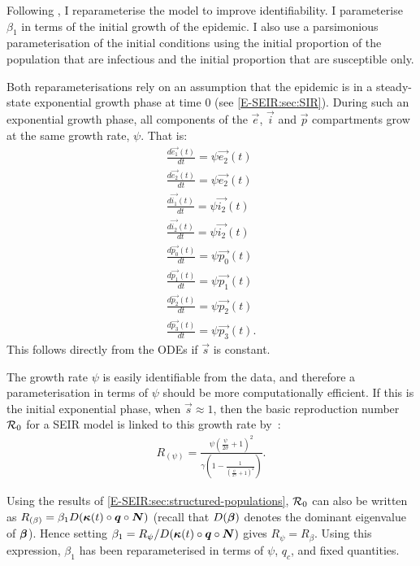 \documentclass[thesis.tex]{subfiles}
\begin{document}
Following \textcite{birrellBayesian}, I reparameterise the model to improve identifiability.
I parameterise $\beta_1$ in terms of the initial growth of the epidemic.
I also use a parsimonious parameterisation of the initial conditions using the initial proportion of the population that are infectious and the initial proportion that are susceptible only.

Both reparameterisations rely on an assumption that the epidemic is in a steady-state exponential growth phase at time 0 (see \cref{E-SEIR:sec:SIR}). During such an exponential growth phase, all components of the $\vec{e}$, $\vec{i}$ and $\vec{p}$ compartments grow at the same growth rate, $\psi$.
That is:
\begin{equation}
\begin{aligned}
\frac{d\vec{e_1}(t)}{dt} = \psi \vec{e_2}(t) \\
\frac{d\vec{e_2}(t)}{dt} = \psi \vec{e_2}(t) \\
\frac{d\vec{i_1}(t)}{dt} = \psi \vec{i_2}(t) \\
\frac{d\vec{i_2}(t)}{dt} = \psi \vec{i_2}(t) \\
\frac{d\vec{p_0}(t)}{dt} = \psi \vec{p_0}(t) \\
\frac{d\vec{p_1}(t)}{dt} = \psi \vec{p_1}(t) \\
\frac{d\vec{p_2}(t)}{dt} = \psi \vec{p_2}(t) \\
\frac{d\vec{p_3}(t)}{dt} = \psi \vec{p_3}(t).
\end{aligned}
\label{SEIR:eq:exponential-growth}
\end{equation}
This follows directly from the ODEs if $\vec{s}$ is constant. 

The growth rate $\psi$ is easily identifiable from the data, and therefore a parameterisation in terms of $\psi$ should be more computationally efficient.
If this is the initial exponential phase, when $\vec{s} \approx 1$, then the basic reproduction number $\mathcal{R}_{0}$ for a SEIR model is linked to this growth rate by~\autocite{birrellBayesian,wearingAppropriate}:
\begin{align}
    R_{(\psi)} = \frac{\psi \left( \frac{\psi}{2\sigma} + 1 \right)^2}{\gamma \left(1 - \frac{1}{\left(\frac{\psi}{2 \gamma} + 1 \right)^2} \right)} \label{SEIR:eq:rtoR}.
\end{align}

Using the results of \cref{E-SEIR:sec:structured-populations}, $\mathcal{R}_{0}$ can also be written as $R_{(\beta)} = \beta_1 D(\bm{\kappa}(t) \circ \bm{q} \circ \bm{N})$ (recall that $D(\bm{\beta})$ denotes the dominant eigenvalue of $\bm{\beta}$).
Hence setting $\beta_1 = R_\psi / D(\bm{\kappa}(t) \circ \bm{q} \circ \bm{N})$ gives $R_\psi = R_\beta$.
Using this expression, $\beta_1$ has been reparameterised in terms of $\psi$, $q_c$, and fixed quantities.
\end{document}
